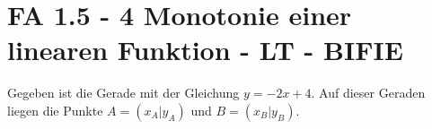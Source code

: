 \section{FA 1.5 - 4 Monotonie einer linearen Funktion - LT - BIFIE}

\begin{beispiel}[FA 1.5]{1} %
Gegeben ist die Gerade mit der Gleichung $y = -2x + 4$. Auf dieser Geraden liegen die Punkte $A = (x_A|y_A)$ und $B = (x_B|y_B)$. \leer

\end{beispiel}